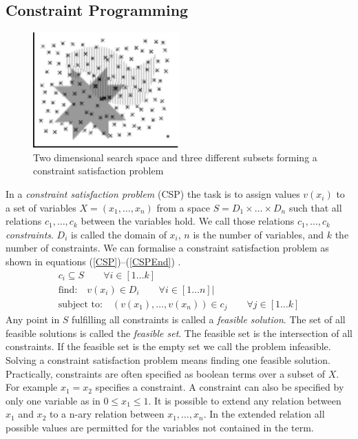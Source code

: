\subsection{Constraint Programming}
\begin{figure}
\label{fig:CSPExample}
\includegraphics[width=0.5\textwidth]{./pics/SetIntersection.pdf}
\caption{Two dimensional search space and three different subsets forming a constraint satisfaction problem}
\end{figure}
In a \emph{constraint satisfaction problem} (CSP) the task is to assign values $v(x_i)$ to a set of variables $X = (x_1, \dots , x_n)$ from a space $S=D_1\times \dots \times D_n$ such that all relations $c_1,\dots,c_k$ between the variables hold. We call those relations $c_1,\dots,c_k$ \emph{constraints}. $D_i$ is called the domain of $x_i$, $n$ is the number of variables, and $k$ the number of constraints. We can formalise a constraint satisfaction problem as shown in equations (\ref{CSP})--(\ref{CSPEnd}) \cite{Eiben97constraintsatisfaction}\cite{wiki:CSP}.
\begin{eqnarray} 
\label{CSP}
c_i \subseteq S \qquad\forall i \in \left[ 1 \dots k \right]\\
\text{find:} \quad v(x_i) \in D_i \qquad\forall i \in \left[ 1 \dots n \right]| \\
\label{CSPEnd}
\text{subject to:} \quad (v(x_1),\dots , v(x_n)) \in c_j\qquad\forall j \in \left[1 \dots k\right]
\end{eqnarray} 
Any point in $S$ fulfilling all constraints is called a \emph{feasible solution}. The set of all feasible solutions is called the \emph{feasible set}. The feasible set is the intersection of all constraints. If the feasible set is the empty set we call the problem infeasible. Solving a constraint satisfaction problem means finding one feasible solution.\\
Practically, constraints are often specified as boolean terms over a subset of $X$. For example $x_1=x_2$ specifies a constraint. A constraint can also be specified by only one variable as in $0\leq x_1 \leq 1$. It is possible to extend any relation between $x_1$ and $x_2$ to a n-ary relation between $x_1,\dots,x_n$. In the extended relation all possible values are permitted for the variables not contained in the term.\\
